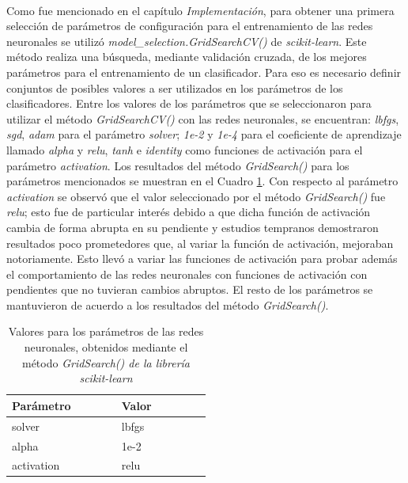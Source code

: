 \paragraph{} Como fue mencionado en el capítulo \textit{Implementación}, para obtener una primera selección de parámetros de configuración para el entrenamiento de las redes neuronales se utilizó \textit{model\_selection.GridSearchCV()} de \textit{scikit-learn}.
Este método realiza una búsqueda, mediante validación cruzada, de los mejores parámetros para el entrenamiento de un clasificador.
Para eso es necesario definir conjuntos de posibles valores a ser utilizados en los parámetros de los clasificadores.
Entre los valores de los parámetros que se seleccionaron para utilizar el método \textit{GridSearchCV()} con las redes neuronales, se encuentran: \textit{lbfgs}, \textit{sgd}, \textit{adam} para el parámetro \textit{solver}; \textit{1e-2} y \textit{1e-4} para el coeficiente de aprendizaje llamado \textit{alpha} y \textit{relu}, \textit{tanh} e \textit{identity} como funciones de activación para el parámetro \textit{activation}.
Los resultados del método \textit{GridSearch()} para los parámetros mencionados se muestran en el Cuadro \ref{table:parametros}.
Con respecto al parámetro \textit{activation} se observó que el valor seleccionado por el método \textit{GridSearch()} fue \textit{relu}; esto fue de particular interés debido a que dicha función de activación cambia de forma abrupta en su pendiente y estudios tempranos demostraron resultados poco prometedores que, al variar la función de activación, mejoraban notoriamente.
Esto llevó a variar las funciones de activación para probar además el comportamiento de las redes neuronales con funciones de activación con pendientes que no tuvieran cambios abruptos.
El resto de los parámetros se mantuvieron de acuerdo a los resultados del método \textit{GridSearch()}.
\\

\begin{table}[h!]

\centering
\begin{tabular}{ |p{0.25\linewidth}|p{0.25\linewidth}| } 
\hline
\textbf{Parámetro} & \textbf{Valor}\\
\hline
solver & lbfgs\\ 
\hline
alpha & 1e-2\\ 
\hline
activation & relu\\ 
\hline
\end{tabular}
\caption{ Valores para los parámetros de las redes neuronales, obtenidos mediante el método \textit{GridSearch() de la librería \textit{scikit-learn}}}
\label{table:parametros}
\end{table}

